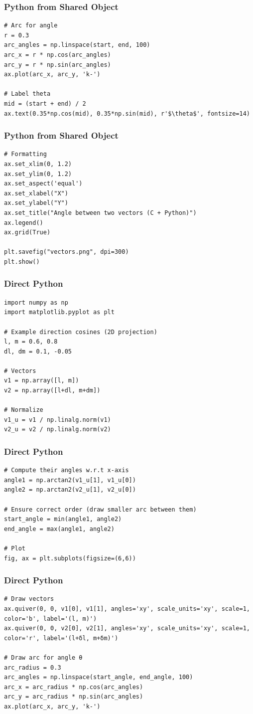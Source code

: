 \documentclass{beamer}
\begin{document}
\begin{frame}[fragile]
\frametitle{Python from Shared Object}
\begin{lstlisting}
# Arc for angle
r = 0.3
arc_angles = np.linspace(start, end, 100)
arc_x = r * np.cos(arc_angles)
arc_y = r * np.sin(arc_angles)
ax.plot(arc_x, arc_y, 'k-')

# Label theta
mid = (start + end) / 2
ax.text(0.35*np.cos(mid), 0.35*np.sin(mid), r'$\theta$', fontsize=14)
\end{lstlisting}
\end{frame}
\begin{frame}[fragile]
\frametitle{Python from Shared Object}
\begin{lstlisting}
# Formatting
ax.set_xlim(0, 1.2)
ax.set_ylim(0, 1.2)
ax.set_aspect('equal')
ax.set_xlabel("X")
ax.set_ylabel("Y")
ax.set_title("Angle between two vectors (C + Python)")
ax.legend()
ax.grid(True)

plt.savefig("vectors.png", dpi=300)
plt.show()
\end{lstlisting}
\end{frame}
\begin{frame}[fragile]
\frametitle{Direct Python }
\begin{lstlisting}
import numpy as np
import matplotlib.pyplot as plt

# Example direction cosines (2D projection)
l, m = 0.6, 0.8
dl, dm = 0.1, -0.05

# Vectors
v1 = np.array([l, m])
v2 = np.array([l+dl, m+dm])

# Normalize
v1_u = v1 / np.linalg.norm(v1)
v2_u = v2 / np.linalg.norm(v2)
\end{lstlisting}
\end{frame}
\begin{frame}[fragile]
\frametitle{Direct Python }
\begin{lstlisting}
# Compute their angles w.r.t x-axis
angle1 = np.arctan2(v1_u[1], v1_u[0])
angle2 = np.arctan2(v2_u[1], v2_u[0])

# Ensure correct order (draw smaller arc between them)
start_angle = min(angle1, angle2)
end_angle = max(angle1, angle2)

# Plot
fig, ax = plt.subplots(figsize=(6,6))
\end{lstlisting}
\end{frame}
\begin{frame}[fragile]
\frametitle{Direct Python }
\begin{lstlisting}
# Draw vectors
ax.quiver(0, 0, v1[0], v1[1], angles='xy', scale_units='xy', scale=1, color='b', label='(l, m)')
ax.quiver(0, 0, v2[0], v2[1], angles='xy', scale_units='xy', scale=1, color='r', label='(l+δl, m+δm)')

# Draw arc for angle θ
arc_radius = 0.3
arc_angles = np.linspace(start_angle, end_angle, 100)
arc_x = arc_radius * np.cos(arc_angles)
arc_y = arc_radius * np.sin(arc_angles)
ax.plot(arc_x, arc_y, 'k-')
\end{lstlisting}
\end{frame}
\end{document}
